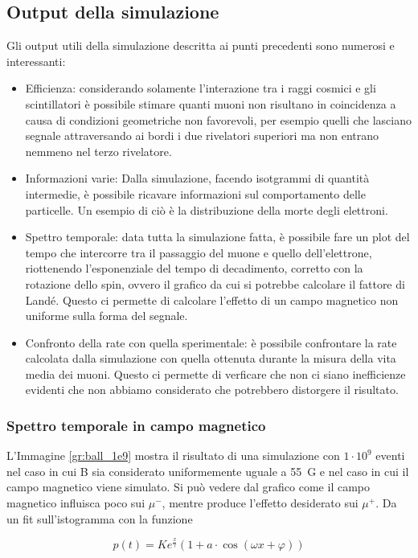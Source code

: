 \subsection{Output della simulazione}
Gli output utili della simulazione descritta ai punti precedenti sono numerosi e interessanti:
\begin{itemize}
\item Efficienza: considerando solamente l'interazione tra i raggi cosmici e gli scintillatori è possibile stimare quanti muoni non risultano in coincidenza a causa
di condizioni geometriche non favorevoli, per esempio quelli che lasciano segnale attraversando ai bordi i due rivelatori superiori ma non entrano nemmeno nel terzo
rivelatore.
\item Informazioni varie: Dalla simulazione, facendo isotgrammi di quantit\`a intermedie, \`e possibile ricavare informazioni sul comportamento delle particelle. Un esempio di ci\`o \`e la distribuzione della morte degli elettroni.
\item Spettro temporale: data tutta la simulazione fatta, è possibile fare un plot del tempo che intercorre tra il passaggio del muone e quello dell'elettrone, riottenendo
l'esponenziale del tempo di decadimento, corretto con la rotazione dello spin, ovvero il grafico da cui si potrebbe calcolare il fattore di Land\'e. Questo ci permette di calcolare l'effetto di un campo magnetico non uniforme sulla forma del segnale.
\item Confronto della rate con quella sperimentale: \`e possibile confrontare la rate calcolata dalla simulazione con quella ottenuta durante la misura della vita media dei muoni. Questo ci permette di verficare che non ci siano inefficienze evidenti che non abbiamo considerato che potrebbero distorgere il risultato.
\end{itemize}

\subsubsection{Spettro temporale in campo magnetico}
L'Immagine \ref{gr:ball_1e9} mostra il risultato di una simulazione con $1\cdot 10^9$ eventi nel caso in cui B sia considerato uniformemente uguale a 55~G e nel caso in cui il campo magnetico viene simulato. 
Si pu\`o vedere dal grafico come il campo magnetico influisca poco sui $\mu^-$, mentre produce l'effetto desiderato sui $\mu^+$. 
Da un fit sull'istogramma con la funzione

\begin{equation}
	p(t) = K e^{\frac{x}{\tau}}\left(1 + a\cdot\cos(\omega x + \varphi)\right)
	\label{eq:sim_fit}
\end{equation}

